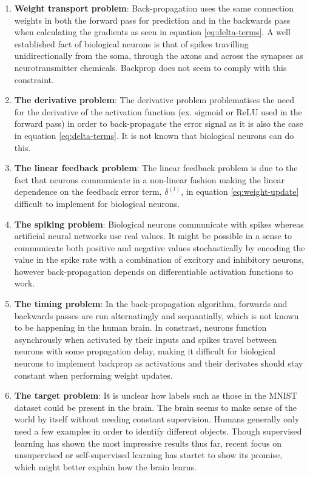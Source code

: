 \documentclass[a4paper,11pt]{article} %
\begin{document}
\begin{enumerate}
  \item \textbf{Weight transport problem}: Back-propagation uses the same connection weights in both the forward pass for prediction and in the backwards pass when calculating the gradients as seen in equation \ref{eq:delta-terms}. A well established fact of biological neurons is that of spikes travilling unidirectionally from the soma, through the axons and across the synapses as neurotransmitter chemicals. Backprop does not seem to comply with this constraint. 
  \item \textbf{The derivative problem}: The derivative problem problematises the need for the derivative of the activation function (ex. sigmoid or ReLU used in the forward pass) in order to back-propagate the error signal as it is also the case in equation \ref{eq:delta-terms}. It is not known that biological neurons can do this.
  \item \textbf{The linear feedback problem}: The linear feedback problem is due to the fact that neurons communicate in a non-linear fashion making the linear dependence on the feedback error term, $\delta^{(l)}$, in equation \ref{eq:weight-update} difficult to implement for biological neurons. 
  \item \textbf{The spiking problem}: Biological neurons communicate with spikes whereas artificial neural networks use real values. It might be possible in a sense to communicate both positive and negative values stochastically by encoding the value in the spike rate with a combination of excitory and inhibitory neurons, however back-propagation depends on differentiable activation functions to work.
  \item \textbf{The timing problem}: In the back-propagation algorithm, forwards and backwards passes are run alternatingly and sequantially, which is not known to be happening in the human brain. In constrast, neurons function asynchrously when activated by their inputs and spikes travel between neurons with some propagation delay, making it difficult for biological neurons to implement backprop as activations and their derivates should stay constant when performing weight updates. 
  \item \textbf{The target problem}: It is unclear how labels such as those in the MNIST dataset could be present in the brain. The brain seems to make sense of the world by itself without needing constant supervision. Humans generally only need a few examples in order to identify different objects. Though supervised learning has shown the most impressive results thus far, recent focus on unsupervised or self-supervised learning has startet to show its promise, which might better explain how the brain learns. 
\end{enumerate}
\end{document}
